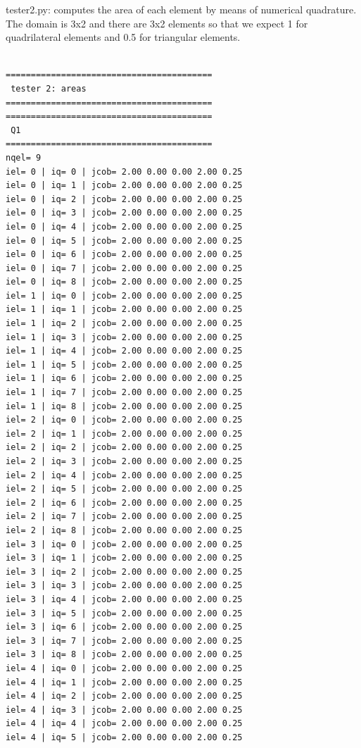 {\pythonfile tester2.py}: computes the area of each element by means of numerical 
quadrature. The domain is 3x2 and there are 3x2 elements so that we expect 1 for 
quadrilateral elements and 0.5 for triangular elements.  

\begin{tiny}
\begin{verbatim}

=========================================
 tester 2: areas
=========================================
=========================================
 Q1
=========================================
nqel= 9
iel= 0 | iq= 0 | jcob= 2.00 0.00 0.00 2.00 0.25
iel= 0 | iq= 1 | jcob= 2.00 0.00 0.00 2.00 0.25
iel= 0 | iq= 2 | jcob= 2.00 0.00 0.00 2.00 0.25
iel= 0 | iq= 3 | jcob= 2.00 0.00 0.00 2.00 0.25
iel= 0 | iq= 4 | jcob= 2.00 0.00 0.00 2.00 0.25
iel= 0 | iq= 5 | jcob= 2.00 0.00 0.00 2.00 0.25
iel= 0 | iq= 6 | jcob= 2.00 0.00 0.00 2.00 0.25
iel= 0 | iq= 7 | jcob= 2.00 0.00 0.00 2.00 0.25
iel= 0 | iq= 8 | jcob= 2.00 0.00 0.00 2.00 0.25
iel= 1 | iq= 0 | jcob= 2.00 0.00 0.00 2.00 0.25
iel= 1 | iq= 1 | jcob= 2.00 0.00 0.00 2.00 0.25
iel= 1 | iq= 2 | jcob= 2.00 0.00 0.00 2.00 0.25
iel= 1 | iq= 3 | jcob= 2.00 0.00 0.00 2.00 0.25
iel= 1 | iq= 4 | jcob= 2.00 0.00 0.00 2.00 0.25
iel= 1 | iq= 5 | jcob= 2.00 0.00 0.00 2.00 0.25
iel= 1 | iq= 6 | jcob= 2.00 0.00 0.00 2.00 0.25
iel= 1 | iq= 7 | jcob= 2.00 0.00 0.00 2.00 0.25
iel= 1 | iq= 8 | jcob= 2.00 0.00 0.00 2.00 0.25
iel= 2 | iq= 0 | jcob= 2.00 0.00 0.00 2.00 0.25
iel= 2 | iq= 1 | jcob= 2.00 0.00 0.00 2.00 0.25
iel= 2 | iq= 2 | jcob= 2.00 0.00 0.00 2.00 0.25
iel= 2 | iq= 3 | jcob= 2.00 0.00 0.00 2.00 0.25
iel= 2 | iq= 4 | jcob= 2.00 0.00 0.00 2.00 0.25
iel= 2 | iq= 5 | jcob= 2.00 0.00 0.00 2.00 0.25
iel= 2 | iq= 6 | jcob= 2.00 0.00 0.00 2.00 0.25
iel= 2 | iq= 7 | jcob= 2.00 0.00 0.00 2.00 0.25
iel= 2 | iq= 8 | jcob= 2.00 0.00 0.00 2.00 0.25
iel= 3 | iq= 0 | jcob= 2.00 0.00 0.00 2.00 0.25
iel= 3 | iq= 1 | jcob= 2.00 0.00 0.00 2.00 0.25
iel= 3 | iq= 2 | jcob= 2.00 0.00 0.00 2.00 0.25
iel= 3 | iq= 3 | jcob= 2.00 0.00 0.00 2.00 0.25
iel= 3 | iq= 4 | jcob= 2.00 0.00 0.00 2.00 0.25
iel= 3 | iq= 5 | jcob= 2.00 0.00 0.00 2.00 0.25
iel= 3 | iq= 6 | jcob= 2.00 0.00 0.00 2.00 0.25
iel= 3 | iq= 7 | jcob= 2.00 0.00 0.00 2.00 0.25
iel= 3 | iq= 8 | jcob= 2.00 0.00 0.00 2.00 0.25
iel= 4 | iq= 0 | jcob= 2.00 0.00 0.00 2.00 0.25
iel= 4 | iq= 1 | jcob= 2.00 0.00 0.00 2.00 0.25
iel= 4 | iq= 2 | jcob= 2.00 0.00 0.00 2.00 0.25
iel= 4 | iq= 3 | jcob= 2.00 0.00 0.00 2.00 0.25
iel= 4 | iq= 4 | jcob= 2.00 0.00 0.00 2.00 0.25
iel= 4 | iq= 5 | jcob= 2.00 0.00 0.00 2.00 0.25

\end{verbatim}
\end{tiny}
